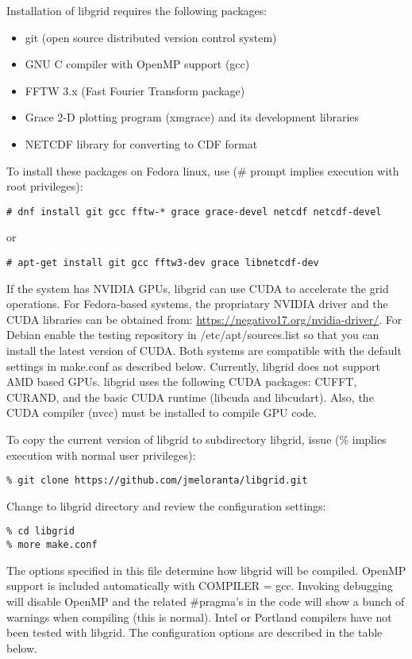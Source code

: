 \documentclass[12pt,letterpaper]{report}
\begin{document}
Installation of libgrid requires the following packages:
\begin{itemize}
\item git (open source distributed version control system)
\item GNU C compiler with OpenMP support (gcc)
\item FFTW 3.x (Fast Fourier Transform package)
\item Grace 2-D plotting program (xmgrace) and its development libraries
\item NETCDF library for converting to CDF format
\end{itemize}
To install these packages on Fedora linux, use (\# prompt implies execution with root privileges): 
\begin{verbatim}
# dnf install git gcc fftw-* grace grace-devel netcdf netcdf-devel
\end{verbatim}
or
\begin{verbatim}
# apt-get install git gcc fftw3-dev grace libnetcdf-dev
\end{verbatim}
If the system has NVIDIA GPUs, libgrid can use CUDA to accelerate the grid operations. For Fedora-based systems, the propriatary NVIDIA driver and the CUDA libraries can be obtained from: \url{https://negativo17.org/nvidia-driver/}. For Debian enable the testing repository in /etc/apt/sources.list so that you can install the latest version of CUDA. Both systems are compatible with the default settings in make.conf as described below. Currently, libgrid does not support AMD based GPUs. libgrid uses the following CUDA packages: CUFFT, CURAND, and the basic CUDA runtime (libcuda and libcudart). Also, the CUDA compiler (nvcc) must be installed to compile GPU code.

To copy the current version of libgrid to subdirectory libgrid, issue (\% implies execution with normal user privileges):
\begin{verbatim}
% git clone https://github.com/jmeloranta/libgrid.git
\end{verbatim}
Change to libgrid directory and review the configuration settings:
\begin{verbatim}
% cd libgrid
% more make.conf
\end{verbatim}
The options specified in this file determine how libgrid will be compiled. OpenMP support is included automatically with COMPILER = gcc. Invoking debugging will disable OpenMP and the related \#pragma's in the code will show a bunch of warnings when compiling (this is normal). Intel or Portland compilers have not been tested with libgrid. The configuration options are described in the table below.\\
\end{document}

